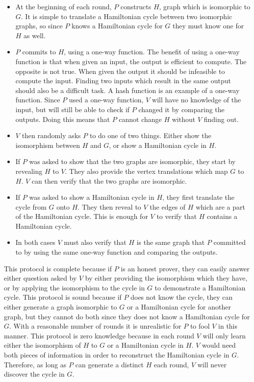 \documentclass{sig-alternate}
\begin{document}
	\begin{itemize}
		\item At the beginning of each round, $P$ constructs $H$, graph which
		is isomorphic to $G$. It is simple to translate a Hamiltonian cycle
		between two isomorphic graphs, so since $P$ knows a Hamiltonian cycle
		for $G$ they must know one for $H$ as well.
		
		\item $P$ commits to $H$, using a one-way function. The benefit of using 
		a one-way function is that when given an 
		input, the output is efficient to compute. The opposite is not true. 
		When given the output it should be infeasible to compute the input.
		Finding two inputs which result in the same output should also be a
		difficult task. A hash function is an example of a one-way function.
		Since $P$ used a one-way function, $V$ will have no knowledge of the
		input, but will still be able to check if $P$ changed it by comparing the
		outputs. Doing this means that $P$ cannot change $H$ without $V$ finding
		out.
		
		\item $V$ then randomly asks $P$ to do one of two things. Either show
		the isomorphism between $H$ and $G$, or show a Hamiltonian cycle in $H$.
		
		\item If $P$ was asked to show that the two graphs are isomorphic, they
		start by revealing $H$ to $V$. They also provide the vertex translations
		which map $G$ to $H$. $V$ can then verify that the two graphs are isomorphic.
		
		\item If $P$ was asked to show a Hamiltonian cycle in $H$, they first 
		translate the cycle from $G$ onto $H$. They then reveal to $V$ the 
		edges of $H$ which are a part of the Hamiltonian cycle. This is
		enough for $V$ to verify that $H$ contains a Hamiltonian cycle.
		
		\item In both cases $V$ must also verify that $H$ is the same graph 
		that $P$ committed to by using the same one-way function and comparing 
		the outputs. 
		
	\end{itemize}
	
	This protocol is complete because if $P$ is an honest prover, they can easily
	answer either question asked by $V$ by either providing the isomorphism which
	they have, or by applying the isomorphism to the cycle in $G$ to demonstrate
	a Hamiltonian cycle. This protocol is sound because if $P$ does not know the
	cycle, they can either generate a graph isomorphic to $G$ or a Hamiltonian
	cycle for another graph, but they cannot do both since they does not know a
	Hamiltonian cycle for $G$. With a reasonable number of rounds it is
	unrealistic for $P$ to fool $V$ in this manner.	This protocol is zero knowledge 
	because in each round $V$ will only learn either the isomorphism of $H$ to $G$
	or a Hamiltonian cycle in $H$. $V$ would need both pieces of information in
	order to reconstruct the Hamiltonian cycle in $G$. Therefore, as long as $P$
	can generate a distinct $H$ each round, $V$ will never discover the cycle in $G$.
	
\end{document}
